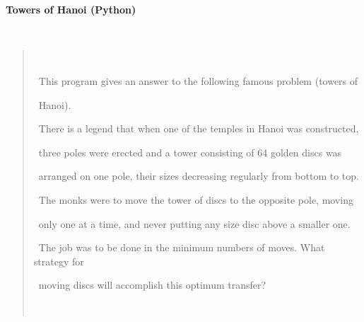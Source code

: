 \documentclass[a4paper,10pt]{article}
\def\mc{\relax}
\begin{document}
\tt\mc 

\noindent
\mbox{}\rm\mc {\tt\#} \hrulefill 
\tt\mc 

\noindent
\mbox{}\rm\mc {\tt\#}
\tt\mc 

\noindent
\mbox{}\rm\mc {\tt\#} \ %
\tt\mc 

\noindent
\mbox{}\rm\mc {\tt\#}
\tt\mc 

\noindent
\mbox{}\rm\mc {\tt\#} \ \centerline{\bf Towers of Hanoi (Python)} 
\tt\mc 

\noindent
\mbox{}\rm\mc {\tt\#}
\tt\mc 

\noindent
\mbox{}\rm\mc {\tt\#} \ \begin{quote} 
\tt\mc 

\noindent
\mbox{}\rm\mc {\tt\#} \ \noindent 
\tt\mc 

\noindent
\mbox{}\rm\mc {\tt\#} \ This program gives an answer to the following famous problem (towers of 
\tt\mc 

\noindent
\mbox{}\rm\mc {\tt\#} \ Hanoi). 
\tt\mc 

\noindent
\mbox{}\rm\mc {\tt\#} \ There is a legend that when one of the temples in Hanoi was constructed, 
\tt\mc 

\noindent
\mbox{}\rm\mc {\tt\#} \ three poles were erected and a tower consisting of 64 golden discs was 
\tt\mc 

\noindent
\mbox{}\rm\mc {\tt\#} \ arranged on one pole, their sizes decreasing regularly from bottom to top. 
\tt\mc 

\noindent
\mbox{}\rm\mc {\tt\#} \ The monks were to move the tower of discs to the opposite pole, moving 
\tt\mc 

\noindent
\mbox{}\rm\mc {\tt\#} \ only one at a time, and never putting any size disc above a smaller one. 
\tt\mc 

\noindent
\mbox{}\rm\mc {\tt\#} \ The job was to be done in the minimum numbers of moves. What strategy for 
\tt\mc 

\noindent
\mbox{}\rm\mc {\tt\#} \ moving discs will accomplish this optimum transfer? 
\tt\mc 

\noindent
\mbox{}\rm\mc {\tt\#} \ \end{quote} 
\tt\mc 

\noindent
\mbox{}\rm\mc {\tt\#}
\tt\mc 

\noindent
\mbox{}\rm\mc {\tt\#} \ %
\tt\mc 

\noindent
\mbox{}\rm\mc {\tt\#}
\tt\mc 

\noindent
\mbox{}\rm\mc {\tt\#} \hrulefill 
\tt\mc 
\end{document}
